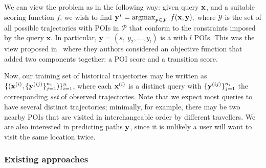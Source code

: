 We can view the {\trajrec} problem as {\seqrec} in the following way:
given {\trajectory} query $\mathbf{x}$, and a suitable scoring function $f$, we wish to find
$\mathbf{y}^* = \operatorname*{argmax}_{\mathbf{y} \in \mathcal{Y}}~f(\mathbf{x}, \mathbf{y}),$
where $\mathcal{Y}$ is the set of all possible trajectories with POIs in $\mathcal{P}$ that conform to the constraints imposed by the query $\mathbf{x}$.
In particular,
$\mathbf{y} = (s,~ y_2, \dots, y_l)$ is a {\trajectory} with $l$ POIs. %
This was the view proposed in~\cite{cikm16paper} where they authors considered an
objective function that added two components together: a POI score and a transition score.

Now, our training set of historical trajectories may be written as
$\{ ( \mathbf{x}^{({i})}, \{ \mathbf{y}^{({ij})} \}_{j=1}^{n_i} ) \}_{i=1}^{n}$,
where each $\mathbf{x}^{({i})}$ is a distinct query
with $\{ \mathbf{y}^{({ij})} \}_{j=1}^{n_i}$ the corresponding \emph{set} of observed trajectories.
Note that we expect most queries to have several distinct trajectories;
minimally,
for example,
there may be two nearby POIs that are visited in interchangeable order by different travellers.
We are also interested in predicting paths $\mathbf{y}$, since it is unlikely a user will want to visit the same location twice.


%
\subsubsection{Existing approaches}

